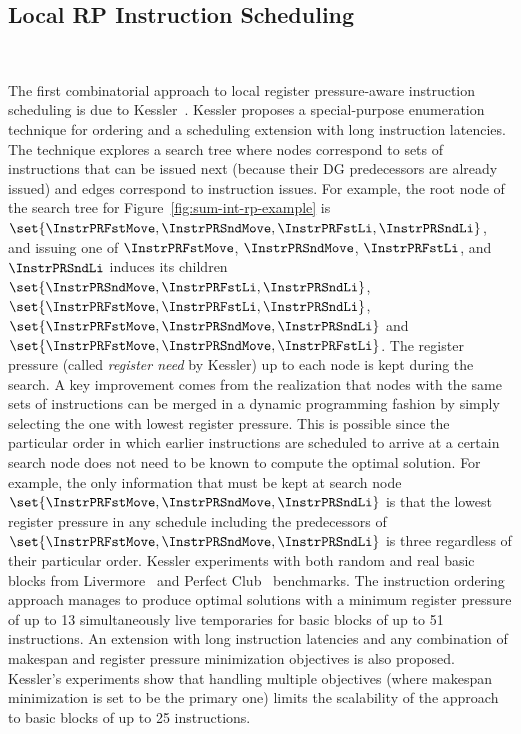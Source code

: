 \documentclass[acmsmall,authorversion,nonacm]{acmart}
\begin{document}
\subsection{Local RP Instruction Scheduling}~\label{sec:local-rp-instruction-scheduling}

The first combinatorial approach to local register pressure-aware
instruction scheduling is due to Kessler~\cite{Kessler1998}.
Kessler proposes a special-purpose enumeration technique for ordering
and a scheduling extension with long instruction latencies.
The technique explores a search tree where nodes correspond to sets of
instructions that can be issued next (because their DG predecessors
are already issued) and edges correspond to instruction issues.
For example, the root node of the search tree for
Figure~\ref{fig:sum-int-rp-example} is
$\set{\InstrPRFstMove,\InstrPRSndMove,\InstrPRFstLi,\InstrPRSndLi}$,
and issuing one of $\InstrPRFstMove$, $\InstrPRSndMove$,
$\InstrPRFstLi$, and $\InstrPRSndLi$ induces its children
$\set{\InstrPRSndMove,\InstrPRFstLi,\InstrPRSndLi}$,
$\set{\InstrPRFstMove,\InstrPRFstLi,\InstrPRSndLi}$,
$\set{\InstrPRFstMove,\InstrPRSndMove,\InstrPRSndLi}$ and
$\set{\InstrPRFstMove,\InstrPRSndMove,\InstrPRFstLi}$.
The register pressure (called \emph{register need} by Kessler) up to
each node is kept during the search.
A key improvement comes from the realization that nodes with the same
sets of instructions can be merged in a dynamic programming fashion by
simply selecting the one with lowest register pressure.
This is possible since the particular order in which earlier
instructions are scheduled to arrive at a certain search node does not
need to be known to compute the optimal solution.
For example, the only information that must be kept at search node
$\set{\InstrPRFstMove,\InstrPRSndMove,\InstrPRSndLi}$ is that the
lowest register pressure in any schedule including the predecessors of
$\set{\InstrPRFstMove,\InstrPRSndMove,\InstrPRSndLi}$ is three
regardless of their particular order.
Kessler experiments with both random and real basic blocks from
Livermore~\cite{McMahon1986} and Perfect Club~\cite{Berry1988}
benchmarks.
The instruction ordering approach manages to produce optimal solutions
with a minimum register pressure of up to 13 simultaneously live
temporaries for basic blocks of up to 51 instructions.
An extension with long instruction latencies and any combination of
makespan and register pressure minimization objectives is also
proposed.
Kessler's experiments show that handling multiple objectives (where
makespan minimization is set to be the primary one) limits the
scalability of the approach to basic blocks of up to 25 instructions.
\end{document}
